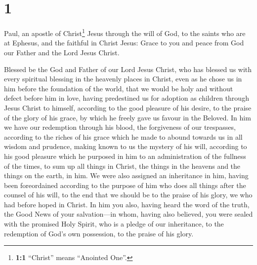 \hypertarget{section}{%
\section{1}\label{section}}

 Paul, an apostle of Christ\footnote{\textbf{1:1}
  ``Christ'' means ``Anointed One''.} Jesus through the will of God, to
the saints who are at Ephesus, and the faithful in Christ Jesus:
 Grace to you and peace from God our Father and the Lord
Jesus Christ.

 Blessed be the God and Father of our Lord Jesus Christ,
who has blessed us with every spiritual blessing in the heavenly places
in Christ,  even as he chose us in him before the
foundation of the world, that we would be holy and without defect before
him in love,  having predestined us for adoption as
children through Jesus Christ to himself, according to the good pleasure
of his desire,  to the praise of the glory of his grace,
by which he freely gave us favour in the Beloved.  In him
we have our redemption through his blood, the forgiveness of our
trespasses, according to the riches of his grace  which he
made to abound towards us in all wisdom and prudence, 
making known to us the mystery of his will, according to his good
pleasure which he purposed in him  to an administration
of the fullness of the times, to sum up all things in Christ, the things
in the heavens and the things on the earth, in him.  We
were also assigned an inheritance in him, having been foreordained
according to the purpose of him who does all things after the counsel of
his will,  to the end that we should be to the praise of
his glory, we who had before hoped in Christ.  In him you
also, having heard the word of the truth, the Good News of your
salvation---in whom, having also believed, you were sealed with the
promised Holy Spirit,  who is a pledge of our
inheritance, to the redemption of God's own possession, to the praise of
his glory.

